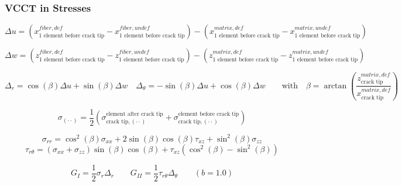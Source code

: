 \documentclass[first,firstsupp,lastsupp,handout,last,hyperref,table]{ETHclass}
\begin{document}
\begin{frame}
\frametitle{VCCT  in Stresses}
\vspace{-0.5cm}
\tiny
\centering
\captionsetup[figure]{font=scriptsize,labelfont=scriptsize}
\begin{equation}
\Delta u = \left(x^{fiber, def}_{\text{1 element before crack tip}}-x^{fiber, undef}_{\text{1 element before crack tip}}\right)-\left(x^{matrix, def}_{\text{1 element before crack tip}}-x^{matrix, undef}_{\text{1 element before crack tip}}\right)
\end{equation}

\begin{equation}
\Delta w = \left(z^{fiber, def}_{\text{1 element before crack tip}}-z^{fiber, undef}_{\text{1 element before crack tip}}\right)-\left(z^{matrix, def}_{\text{1 element before crack tip}}-z^{matrix, undef}_{\text{1 element before crack tip}}\right)
\end{equation}


\begin{equation}
\Delta_{r}=\cos{\left(\beta\right)}\Delta u+\sin{\left(\beta\right)}\Delta w\quad\Delta_{\theta}=-\sin{\left(\beta\right)}\Delta u+\cos{\left(\beta\right)}\Delta w\qquad\text{with}\quad\beta=\arctan{\left(\frac{z^{matrix, def}_{\text{crack tip}}}{x^{matrix, def}_{\text{crack tip}}}\right)}
\end{equation}

\begin{equation}
\sigma_{\left(\cdot\cdot\right)}=\frac{1}{2}\left(\sigma^{\text{element after crack tip}}_{\text{crack tip},\left(\cdot\cdot\right)}+\sigma^{\text{element before crack tip}}_{\text{crack tip},\left(\cdot\cdot\right)}\right)
\end{equation}

\begin{equation}
\sigma_{rr}=\cos^{2}{\left(\beta\right)}\sigma_{xx}+2\sin{\left(\beta\right)}\cos{\left(\beta\right)}\tau_{xz}+\sin^{2}{\left(\beta\right)}\sigma_{zz}
\end{equation}
\begin{equation}
\tau_{r\theta}=\left(\sigma_{xx}+\sigma_{zz}\right)\sin{\left(\beta\right)}\cos{\left(\beta\right)} + \tau_{xz}\left(\cos^{2}{\left(\beta\right)}-\sin^{2}{\left(\beta\right)}\right)
\end{equation}

\begin{equation}
G_{I}=\frac{1}{2}\sigma_{r}\Delta_{r}\qquad G_{II}=\frac{1}{2}\tau_{r\theta}\Delta_{\theta}\qquad \left(b=1.0\right)
\end{equation}
\end{frame}
\end{document}
